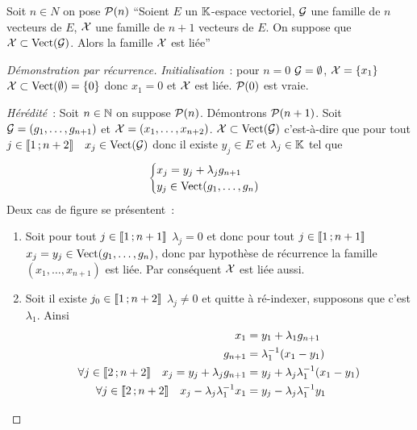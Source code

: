 \begin{lemme}
  Soit \(n \in N\) on pose \(\P(n)\) ``Soient \(E\) un \(\K\)-espace vectoriel, 
  \(\G\) une famille de \(n\) vecteurs de \(E\), \(\X\) une famille de \(n+1\) 
  vecteurs de \(E\). On suppose que \(\X \subset \VectEngendre(\G)\). Alors la 
  famille \(\X\) est liée''
\end{lemme}
\begin{proof}[Démonstration par récurrence]
  \emph{Initialisation}~: pour \(n=0\) \(\G=\emptyset\), \(\X=\{x_1\}\) \(\X 
  \subset \VectEngendre(\emptyset)=\{0\}\) donc \(x_1=0\) et \(\X\) est liée. 
  \(\P(0)\) est vraie.

  \emph{Hérédité}~: Soit \(n \in \N\) on suppose \(\P(n)\). Démontrons 
  \(\P(n+1)\). Soit \(\G=(g_1, \ldots, g_{n+1})\) et \(\X=(x_1, \ldots, 
  x_{n+2})\). \(\X \subset \VectEngendre(\G)\) c'est-à-dire que pour tout \(j 
  \in \intervalleentier{1}{n+2} \quad x_j \in \VectEngendre(\G)\) donc il existe 
  \(y_j \in E\) et \(\lambda_j \in \K\) tel que
  \begin{equation}
    \begin{cases} x_j = y_j + \lambda_j g_{n+1} \\ y_j \in \VectEngendre(g_1, 
    \ldots, g_n) \end{cases}
  \end{equation}
  Deux cas de figure se présentent~:
  \begin{enumerate}
    \item Soit pour tout \(j \in \intervalleentier{1}{n+1}\) \(\lambda_j=0\) et 
      donc pour tout \(j \in \intervalleentier{1}{n+1}\) \(x_j=y_j \in 
      \VectEngendre(g_1, \ldots, g_n)\), donc par hypothèse de récurrence la 
      famille \((x_1, \ldots, x_{n+1})\) est liée. Par conséquent \(\X\) est 
      liée aussi.
    \item Soit il existe \(j_0 \in \intervalleentier{1}{n+2}\) \(\lambda_j \neq 
      0\) et quitte à ré-indexer, supposons que c'est \(\lambda_1\). Ainsi
      \begin{align}
        x_1 &= y_1 + \lambda_1 g_{n+1} \\
        g_{n+1} &= \lambda_1^{-1}(x_1-y_1) \\
        \forall j \in \intervalleentier{2}{n+2} \quad x_j = y_j + \lambda_j 
        g_{n+1} &= y_j + \lambda_j \lambda_1^{-1}(x_1-y_1)\\
        \forall j \in \intervalleentier{2}{n+2} \quad x_j - 
        \lambda_j\lambda_1^{-1}x_1 &= y_j - \lambda_j \lambda_1^{-1} y_1
      \end{align}

\end{enumerate}
\end{proof}
